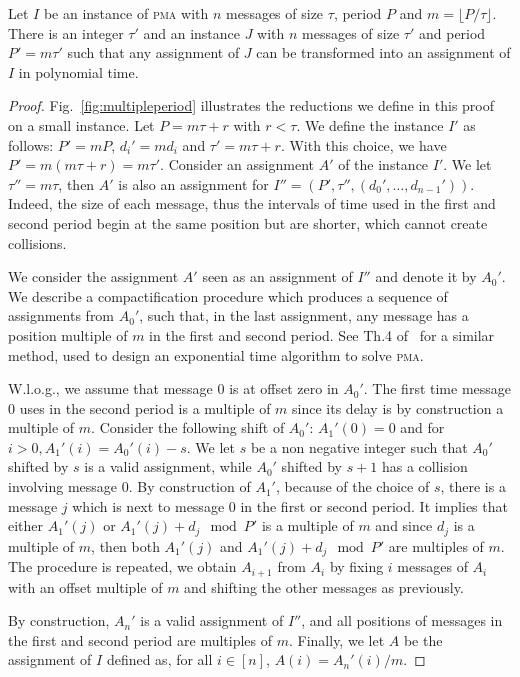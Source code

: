 \documentclass[a4paper,UKenglish,cleveref, autoref, thm-restate]{lipics-v2019}
\newcommand\pma{\textsc{pma}\xspace}
\begin{document}
\begin{lemma}\label{lemma:multiple}
Let $I$ be an instance of \pma with $n$ messages of size $\tau$, period $P$ and $m = \lfloor P / \tau \rfloor$. There is an integer $\tau'$ and an instance $J$ with $n$ messages of size $\tau'$ and period $P'= m\tau'$ such that any assignment of $J$ can be transformed into an assignment of $I$ in polynomial time.
\end{lemma}
\begin{proof}
Fig.~\ref{fig:multipleperiod} illustrates the reductions we define in this proof on a small instance.
Let $P = m \tau + r$ with $r < \tau$. We define the instance $I'$ as follows: $P' = mP$, $d_{i}' = m d_i$ and $\tau' = m \tau + r$. With this choice, we have $P' = m(m \tau + r) = m \tau'$.
Consider an assignment $A'$ of the instance $I'$. We let $\tau'' = m\tau$, then $A'$ is also an assignment for $I'' = (P',\tau'',(d_{0}',\dots,d_{n-1}'))$. Indeed, the size of each message, thus the intervals of time used in the first and second period begin at the same position but are shorter, which cannot create collisions. 

We consider the assignment $A'$ seen as an assignment of $I''$ and denote it by $A_0'$.
We describe a compactification procedure which produces a sequence of assignments from $A_0'$, such that, in the last assignment, any message has a position multiple of $m$ in the first and second period. See Th.4 of~\cite{bartharxiv2018deterministic} for a similar method, used to design an exponential time algorithm to solve \pma. 

W.l.o.g., we assume that message $0$ is at offset zero in $A_0'$. The first time message $0$ uses in the second period is a multiple of $m$ since its delay is by construction a multiple of $m$. Consider the following shift of $A_0'$: $A_1'(0) = 0$ and for $i>0, A_1'(i) = A_0'(i) - s$. We let $s$ be a non negative integer such that $A_0'$ shifted by $s$ is a valid assignment, while $A_0'$ shifted by $s+1$ has a collision involving message $0$. By construction of $A_1'$, because of the choice of $s$, there is a message $j$ which is next to message $0$ in the first or second period. It implies that either $A_1'(j)$ or $A_1'(j)+d_j \mod P'$ is a multiple of $m$ and since $d_j$ is a multiple of $m$, then both $A_1'(j)$ and $A_1'(j)+d_j \mod P'$ are multiples of $m$. The procedure is repeated, we obtain $A_{i+1}$ from $A_i$ by fixing $i$ messages of $A_i$ with an offset multiple of $m$ and shifting the other messages as previously. 

By construction, $A_n'$ is a valid assignment of $I''$, and all positions of messages in the first and second period are multiples of $m$. Finally, we let $A$ be the assignment of $I$ defined as, for all $i \in [n]$, $A(i) = A_n'(i)/m$. 
\end{proof}
\end{document}

